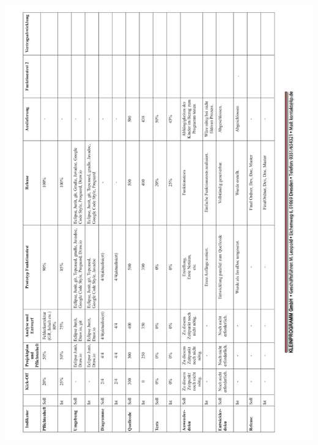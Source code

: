 \documentclass[12pt]{article}
\begin{document}
\newpage
\includegraphics[scale=0.9]{Fortschrittstabelle.pdf}
\clearpage
\printglossaries
\end{document}
